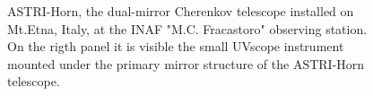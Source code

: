 \begin{figure}
\caption{ASTRI-Horn, the dual-mirror Cherenkov telescope installed on Mt.Etna, Italy, at the INAF "M.C. Fracastoro" observing station. On the rigth panel it is visible the small UVscope instrument mounted under the primary mirror structure of the ASTRI-Horn telescope.}
\label{fig:ASTRI-Horn-with-UVscope}
\end{figure}

